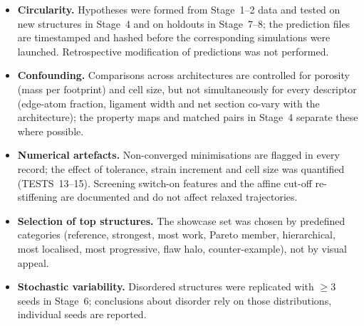 \begin{itemize}
\item \textbf{Circularity.} Hypotheses were formed from Stage~1--2 data and tested on new structures in Stage~4 and on holdouts in Stage~7--8; the prediction files are timestamped and hashed before the corresponding simulations were launched. Retrospective modification of predictions was not performed.
\item \textbf{Confounding.} Comparisons across architectures are controlled for porosity (mass per footprint) and cell size, but not simultaneously for every descriptor (edge-atom fraction, ligament width and net section co-vary with the architecture); the property maps and matched pairs in Stage~4 separate these where possible.
\item \textbf{Numerical artefacts.} Non-converged minimisations are flagged in every record; the effect of tolerance, strain increment and cell size was quantified (TESTS~13--15). Screening switch-on features and the affine cut-off re-stiffening are documented and do not affect relaxed trajectories.
\item \textbf{Selection of top structures.} The showcase set was chosen by predefined categories (reference, strongest, most work, Pareto member, hierarchical, most localised, most progressive, flaw halo, counter-example), not by visual appeal.
\item \textbf{Stochastic variability.} Disordered structures were replicated with $\ge3$ seeds in Stage~6; conclusions about disorder rely on those distributions, individual seeds are reported.
\end{itemize}
